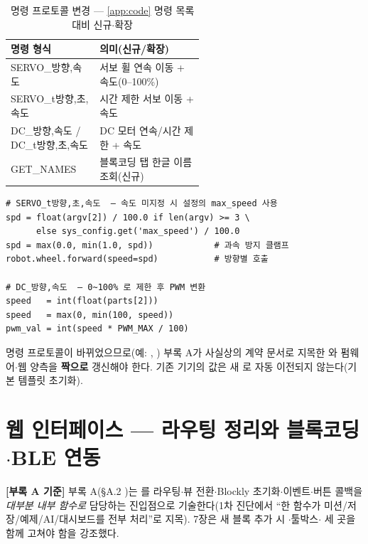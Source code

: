 \begin{table}[htbp]\centering\small
\caption{명령 프로토콜 변경 --- \ref{app:code} 명령 목록 대비 신규$\cdot$확장}
\renewcommand{\arraystretch}{1.2}
\begin{tabularx}{\linewidth}{@{}>{\ttfamily\footnotesize}l L{0.54\linewidth}@{}}
\toprule
\sffamily 명령 형식 & \sffamily 의미(신규/확장) \\
\midrule
SERVO\_방향,속도          & 서보 휠 연속 이동 + 속도(0--100\%) \\
SERVO\_t방향,초,속도       & 시간 제한 서보 이동 + 속도 \\
DC\_방향,속도 / DC\_t방향,초,속도 & DC 모터 연속/시간 제한 + 속도 \\
GET\_NAMES                & 블록코딩 탭 한글 이름 조회(신규) \\
\bottomrule
\end{tabularx}
\end{table}

\begin{verbatim}
# SERVO_t방향,초,속도  — 속도 미지정 시 설정의 max_speed 사용
spd = float(argv[2]) / 100.0 if len(argv) >= 3 \
      else sys_config.get('max_speed') / 100.0
spd = max(0.0, min(1.0, spd))            # 과속 방지 클램프
robot.wheel.forward(speed=spd)           # 방향별 호출

# DC_방향,속도  — 0~100% 로 제한 후 PWM 변환
speed   = int(float(parts[2]))
speed   = max(0, min(100, speed))
pwm_val = int(speed * PWM_MAX / 100)
\end{verbatim}

\begin{notebox}[주의 --- 계약 문서 갱신 필요]
명령 프로토콜이 바뀌었으므로(예: , ) 부록 A가
사실상의 계약 문서로 지목한 \code{API\_DOCUMENTATION.md}와 펌웨어$\cdot$웹 양측을
\textbf{짝으로} 갱신해야 한다. 기존 기기의  값은 새
로 자동 이전되지 않는다(기본 템플릿 초기화).
\end{notebox}

\section{웹 인터페이스 --- 라우팅 정리와 블록코딩$\cdot$BLE 연동}
\textbf{[부록 A 기준]} 부록 A(\S A.2 )는 를 라우팅$\cdot$뷰
전환$\cdot$Blockly 초기화$\cdot$이벤트$\cdot$버튼 콜백을 \emph{대부분 내부 함수로} 담당하는
진입점으로 기술한다(1차 진단에서 ``한 함수가 미션/저장/예제/AI/대시보드를 전부 처리''로
지목). 7장은 새 블록 추가 시 $\cdot$툴박스$\cdot$
세 곳을 함께 고쳐야 함을 강조했다.

